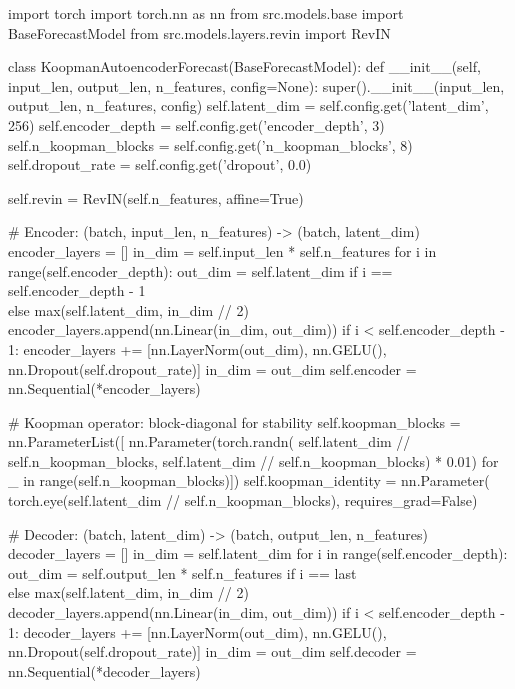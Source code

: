 \begin{nolinenumbers}
\begin{promptbox}
import torch
import torch.nn as nn
from src.models.base import BaseForecastModel
from src.models.layers.revin import RevIN

class KoopmanAutoencoderForecast(BaseForecastModel):
    def __init__(self, input_len, output_len, n_features, config=None):
        super().__init__(input_len, output_len, n_features, config)
        self.latent_dim = self.config.get('latent_dim', 256)
        self.encoder_depth = self.config.get('encoder_depth', 3)
        self.n_koopman_blocks = self.config.get('n_koopman_blocks', 8)
        self.dropout_rate = self.config.get('dropout', 0.0)

        self.revin = RevIN(self.n_features, affine=True)

        # Encoder: (batch, input_len, n_features) -> (batch, latent_dim)
        encoder_layers = []
        in_dim = self.input_len * self.n_features
        for i in range(self.encoder_depth):
            out_dim = self.latent_dim if i == self.encoder_depth - 1 \\
                      else max(self.latent_dim, in_dim // 2)
            encoder_layers.append(nn.Linear(in_dim, out_dim))
            if i < self.encoder_depth - 1:
                encoder_layers += [nn.LayerNorm(out_dim), nn.GELU(), \\
                                   nn.Dropout(self.dropout_rate)]
            in_dim = out_dim
        self.encoder = nn.Sequential(*encoder_layers)

        # Koopman operator: block-diagonal for stability
        self.koopman_blocks = nn.ParameterList([
            nn.Parameter(torch.randn(
                self.latent_dim // self.n_koopman_blocks,
                self.latent_dim // self.n_koopman_blocks) * 0.01)
            for _ in range(self.n_koopman_blocks)])
        self.koopman_identity = nn.Parameter(
            torch.eye(self.latent_dim // self.n_koopman_blocks),
            requires_grad=False)

        # Decoder: (batch, latent_dim) -> (batch, output_len, n_features)
        decoder_layers = []
        in_dim = self.latent_dim
        for i in range(self.encoder_depth):
            out_dim = self.output_len * self.n_features if i == last \\
                      else max(self.latent_dim, in_dim // 2)
            decoder_layers.append(nn.Linear(in_dim, out_dim))
            if i < self.encoder_depth - 1:
                decoder_layers += [nn.LayerNorm(out_dim), nn.GELU(), \\
                                   nn.Dropout(self.dropout_rate)]
            in_dim = out_dim
        self.decoder = nn.Sequential(*decoder_layers)


\end{promptbox}
\end{nolinenumbers}
